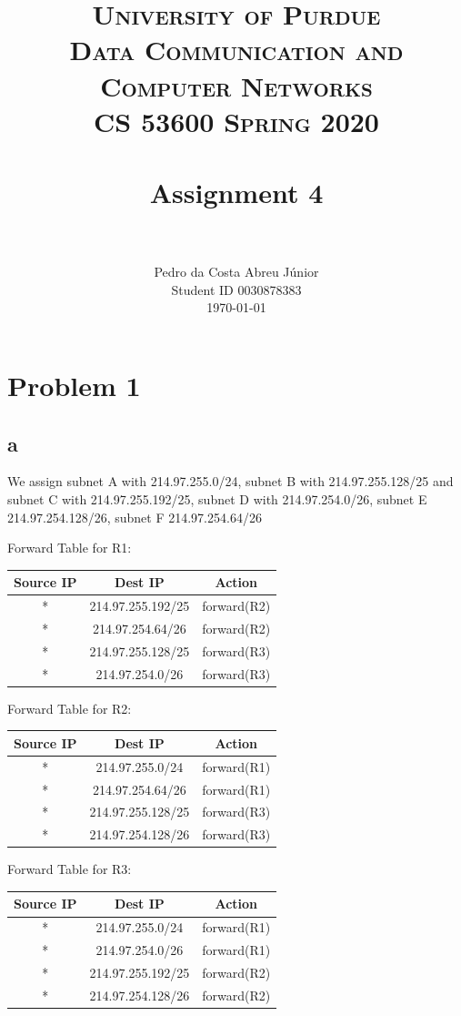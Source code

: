 \documentclass[paper=a4, fontsize=11pt]{scrartcl}
\title{
		\usefont{OT1}{bch}{b}{n}
		\normalfont \normalsize \textsc{University of Purdue\\
      Data Communication and Computer Networks\\
      CS 53600 Spring 2020} \\ [25pt]
		\horrule{0.5pt} \\[0.4cm]
		\huge Assignment 4\\
		\horrule{2pt} \\[0.5cm]
}
\author{
		\normalfont\normalsize Pedro da Costa Abreu Júnior\\ [-5pt]
    \normalsize Student ID 0030878383\\[-5pt]
    \normalsize \today
}
\date{}
\numberwithin{equation}{section}		%
\numberwithin{figure}{section}			%
\numberwithin{table}{section}				%
\begin{document}
\maketitle

\section*{Problem 1}
\subsection*{a}
We assign subnet A with 214.97.255.0/24, subnet B with 214.97.255.128/25 and
subnet C with 214.97.255.192/25, subnet D with 214.97.254.0/26,
subnet E 214.97.254.128/26, subnet F 214.97.254.64/26

Forward Table for R1:
\begin{center}
\begin{tabular}{ | c | c | c |}
  \hline
  Source IP & Dest IP & Action \\
  \hline
  * & 214.97.255.192/25 & forward(R2)\\
  \hline
  * & 214.97.254.64/26 & forward(R2) \\
  \hline
  * & 214.97.255.128/25 & forward(R3) \\
  \hline
  * & 214.97.254.0/26 & forward(R3) \\
  \hline
\end{tabular}
\end{center}


Forward Table for R2:
\begin{center}
\begin{tabular}{ | c | c | c |}
  \hline
  Source IP & Dest IP & Action \\
  \hline
  * & 214.97.255.0/24 & forward(R1)\\
  \hline
  * & 214.97.254.64/26 & forward(R1)\\
  \hline
  * & 214.97.255.128/25 & forward(R3) \\
  \hline
  * & 214.97.254.128/26 & forward(R3) \\
  \hline
\end{tabular}
\end{center}



Forward Table for R3:
\begin{center}
\begin{tabular}{ | c | c | c |}
  \hline
  Source IP & Dest IP & Action \\
  \hline
  * & 214.97.255.0/24 & forward(R1)\\
  \hline
  * & 214.97.254.0/26 & forward(R1)\\
  \hline
  * & 214.97.255.192/25 & forward(R2) \\
  \hline
  * & 214.97.254.128/26 & forward(R2) \\
  \hline
\end{tabular}
\end{center}
\end{document}
